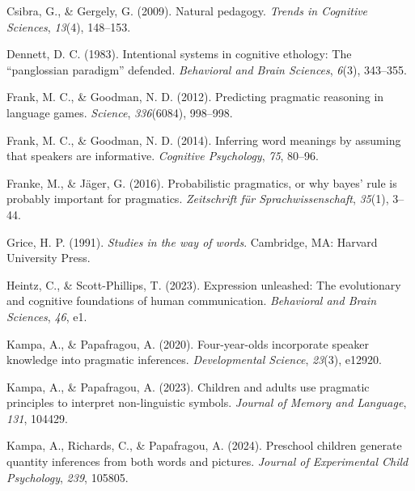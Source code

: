 \documentclass[
  man,floatsintext]{apa6}
\newlength{\cslhangindent}
\newlength{\cslentryspacingunit} %
\newenvironment{CSLReferences}[2] %
 {%
  \setlength{\parindent}{0pt}
  \ifodd #1
  \let\oldpar\par
  \def\par{\hangindent=\cslhangindent\oldpar}
  \fi
  \setlength{\parskip}{#2\cslentryspacingunit}
 }%
 {}
\begin{document}
\begin{CSLReferences}{1}{0}
\leavevmode{}%
Csibra, G., \& Gergely, G. (2009). Natural pedagogy. \emph{Trends in Cognitive Sciences}, \emph{13}(4), 148--153.

\leavevmode{}%
Dennett, D. C. (1983). Intentional systems in cognitive ethology: The {``panglossian paradigm''} defended. \emph{Behavioral and Brain Sciences}, \emph{6}(3), 343--355.

\leavevmode{}%
Frank, M. C., \& Goodman, N. D. (2012). Predicting pragmatic reasoning in language games. \emph{Science}, \emph{336}(6084), 998--998.

\leavevmode{}%
Frank, M. C., \& Goodman, N. D. (2014). Inferring word meanings by assuming that speakers are informative. \emph{Cognitive Psychology}, \emph{75}, 80--96.

\leavevmode{}%
Franke, M., \& Jäger, G. (2016). Probabilistic pragmatics, or why bayes' rule is probably important for pragmatics. \emph{Zeitschrift f{ü}r Sprachwissenschaft}, \emph{35}(1), 3--44.

\leavevmode{}%
Grice, H. P. (1991). \emph{Studies in the way of words}. Cambridge, MA: Harvard University Press.

\leavevmode{}%
Heintz, C., \& Scott-Phillips, T. (2023). Expression unleashed: The evolutionary and cognitive foundations of human communication. \emph{Behavioral and Brain Sciences}, \emph{46}, e1.

\leavevmode{}%
Kampa, A., \& Papafragou, A. (2020). Four-year-olds incorporate speaker knowledge into pragmatic inferences. \emph{Developmental Science}, \emph{23}(3), e12920.

\leavevmode{}%
Kampa, A., \& Papafragou, A. (2023). Children and adults use pragmatic principles to interpret non-linguistic symbols. \emph{Journal of Memory and Language}, \emph{131}, 104429.

\leavevmode{}%
Kampa, A., Richards, C., \& Papafragou, A. (2024). Preschool children generate quantity inferences from both words and pictures. \emph{Journal of Experimental Child Psychology}, \emph{239}, 105805.


\end{CSLReferences}
\end{document}
